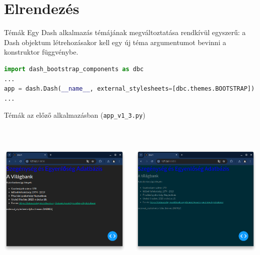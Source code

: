 \documentclass[english, aspectratio=169]{beamer}
\makeatletter
\let\origtableofcontents=\tableofcontents
\def\tableofcontents{\@ifnextchar[{\origtableofcontents}{\gobbletableofcontents}}
\def\gobbletableofcontents#1{\origtableofcontents}
\makeatother
\begin{document}
	\section{Elrendezés}
	
	\begin{frame}{}
		\tableofcontents[currentsection]
	\end{frame}
	
	\begin{frame}[fragile]{Témák}
		Egy Dash alkalmazás témájának megváltoztatása rendkívül egyszerű: a Dash objektum létrehozásakor kell egy új téma argumentumot bevinni a konstruktor függvénybe.\par\medskip
		\begin{lstlisting}[language=python]
import dash_bootstrap_components as dbc
...
app = dash.Dash(__name__, external_stylesheets=[dbc.themes.BOOTSTRAP])
...
		\end{lstlisting}
	\end{frame}
	
	\begin{frame}{Témák az előző alkalmazásban (\texttt{app\_v1\_3.py})}
		\begin{columns}
			\begin{column}{.5\textwidth}
				\begin{center}
					\includegraphics[width=7cm, height=7cm, keepaspectratio]{images/dash_7.png}
				\end{center}
			\end{column}
			\begin{column}{.5\textwidth}
				\begin{center}
					\includegraphics[width=7cm, height=7cm, keepaspectratio]{images/dash_8.png}
				\end{center}
			\end{column}
		\end{columns}
	\end{frame}
	
\end{document}
